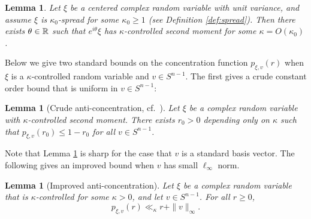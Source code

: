 \documentclass[aop,preprint]{imsart}
\theoremstyle{plain}
\newtheorem{lemma}[theorem]{Lemma}
\theoremstyle{definition}
\theoremstyle{remark}
\numberwithin{equation}{section}
\numberwithin{theorem}{section}
\begin{document}
\begin{lemma}		\label{lem:wlog.kappa}
Let $\xi$ be a centered complex random variable with unit variance, and assume $\xi$ is $\kappa_0$-spread for some $\kappa_0 \ge 1$ (see Definition \ref{def:spread}).
Then there exists $\theta \in {\mathbb R}$ such that $e^{i\theta}\xi$ has $\kappa$-controlled second moment for some $\kappa=O(\kappa_0)$.
\end{lemma}


Below we give two standard bounds on the concentration function $p_{\xi,v}(r)$ when $\xi$ is a $\kappa$-controlled random variable and $v\in S^{n-1}$. 
The first gives a crude constant order bound that is uniform in $v\in S^{n-1}$:

\begin{lemma}[Crude anti-concentration, cf.\ {\cite[Corollary 6.3]{TaVu:smooth}}]	\label{lem:anti_crude}
Let $\xi$ be a complex random variable with $\kappa$-controlled second moment. 
There exists $r_0>0$ depending only on $\kappa$ such that $p_{\xi,v}(r_0) \le 1-r_0$ for all $v\in S^{n-1}$.
\end{lemma}

Note that Lemma \ref{lem:anti_crude} is sharp for the case that $v$ is a standard basis vector.
The following gives an improved bound when $v$ has small $\ell_\infty$ norm.

\begin{lemma}[Improved anti-concentration]		\label{lem:anti_improved}
Let $\xi$ be a complex random variable that is $\kappa$-controlled for some $\kappa>0$, and let $v\in S^{n-1}$.
For all $r\ge0$,
\begin{equation}	\label{be:1d}
p_{\xi,v}(r) \ll_\kappa r + \|v\|_\infty.
\end{equation}
\end{lemma}
\end{document}
